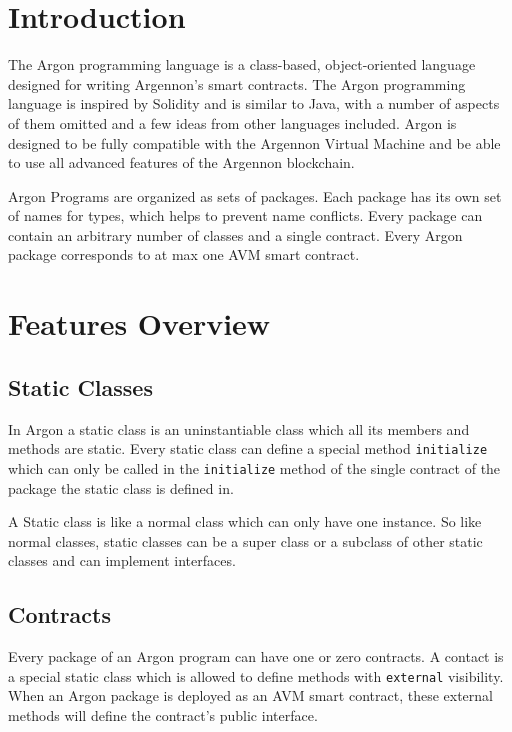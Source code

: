 

\section{Introduction}\label{sec:introduction2}

The Argon programming language is a class-based, object-oriented language designed for writing Argennon's smart
contracts. The Argon programming language is inspired by Solidity and is similar to Java, with a number of aspects
of them omitted and a few ideas from other languages included. Argon is designed to be fully compatible with
the Argennon Virtual Machine and be able to use all advanced features of the Argennon blockchain.

Argon Programs are organized as sets of packages. Each package has its own set of names for types, which helps
to prevent name conflicts. Every package can contain an arbitrary number of classes and a single contract. Every
Argon package corresponds to at max one AVM smart contract.


\section{Features Overview}\label{sec:features-overview}

\subsection{Static Classes}\label{subsec:static-classes}

In Argon a static class is an uninstantiable class which all its members and methods are static. Every static
class can define a special method \texttt{initialize} which can only be called in the \texttt{initialize}
method of the single contract of the package the static class is defined in.

A Static class is like a normal class which can only have one instance. So like normal classes, static classes can
be a super class or a subclass of other static classes and can implement interfaces.

\subsection{Contracts}\label{subsec:contract}

Every package of an Argon program can have one or zero contracts. A contact is a special static class which is
allowed to define methods with \texttt{external} visibility. When an Argon package is deployed as an AVM smart
contract, these external methods will define the contract's public interface.

